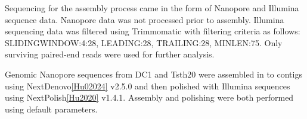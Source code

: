 Sequencing for the assembly process came in the form of Nanopore and
Illumina sequence data. Nanopore data was not processed prior to
assembly. Illumina sequencing data was filtered using Trimmomatic with
filtering criteria as follows: SLIDINGWINDOW:4:28, LEADING:28,
TRAILING:28, MINLEN:75. Only surviving paired-end reads were used for
further analysis.

Genomic Nanopore sequences from DC1 and Tsth20 were assembled in to
contigs using NextDenovo\ref{Hu02024} v2.5.0 and then polished with
Illumina sequences using NextPolish\ref{Hu2020} v1.4.1. Assembly and
polishing were both performed using default parameters.






